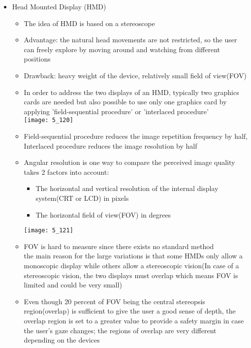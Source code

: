 \documentclass{standalone}
\begin{document}
\begin{itemize}
	\item Head Mounted Display (HMD)
	\begin{itemize}
		\item The idea of HMD is based on a stereoscope
		\item Advantage: the natural head movements are not restricted, so the user can freely explore by moving around and watching from different positions
		\item Drawback: heavy weight of the device, relatively small field of view(FOV)
		\item In order to address the two displays of an HMD, typically two graphics cards are needed but also possible to use only one graphics card by applying 'field-sequential procedure' or 'interlaced procedure' \\
		\texttt{[image: 5\_120]}
		\item Field-sequential procedure reduces the image repetition frequency by half, Interlaced procedure reduces the image resolution by half
		\item Angular resolution is one way to compare the perceived image quality \\
		takes 2 factors into account:
		\begin{itemize}
			\item The horizontal and vertical resolution of the internal display system(CRT or
LCD) in pixels
			\item The horizontal field of view(FOV) in degrees
		\end{itemize}
		\texttt{[image: 5\_121]}
		\item FOV is hard to measure since there exists no standard method \\
		the main reason for the large variations is that some HMDs only allow a monoscopic display while others allow a stereoscopic vision(In case of a stereoscopic vision, the two displays must overlap which means FOV is limited and could be very small)
		\item Even though 20 percent of FOV being the central stereopsis region(overlap) is sufficient to give the user a good sense of depth, the overlap region is set to a greater value to provide a safety margin in case the user's gaze changes; the regions of overlap are very different depending on the devices
	\end{itemize}
	

\end{itemize}
\end{document}

